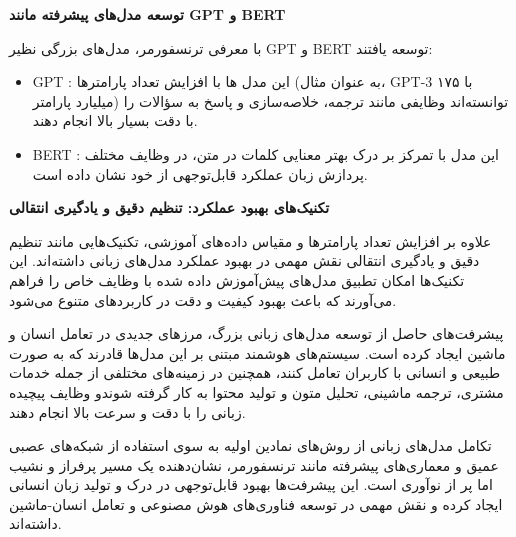 \textbf{توسعه مدل‌های پیشرفته مانند GPT و BERT}

\noindent با معرفی ترنسفورمر، مدل‌های بزرگی نظیر GPT و BERT توسعه یافتند:
\begin{itemize}
	\item GPT
	: این مدل ها با افزایش تعداد پارامترها (به عنوان مثال، GPT-3 با ۱۷۵ میلیارد پارامتر) توانسته‌اند وظایفی مانند ترجمه، خلاصه‌سازی و پاسخ به سؤالات را با دقت بسیار بالا انجام دهند.
	\item BERT
	: این مدل با تمرکز بر درک بهتر معنایی کلمات در متن، در وظایف مختلف پردازش زبان عملکرد قابل‌توجهی از خود نشان داده است.
\end{itemize}

\textbf{تکنیک‌های بهبود عملکرد: تنظیم دقیق و یادگیری انتقالی}

\noindent علاوه بر افزایش تعداد پارامترها و مقیاس داده‌های آموزشی، تکنیک‌هایی مانند تنظیم دقیق
 و یادگیری انتقالی
  نقش مهمی در بهبود عملکرد مدل‌های زبانی داشته‌اند. این تکنیک‌ها امکان تطبیق مدل‌های پیش‌آموزش داده شده با وظایف خاص را فراهم می‌آورند که باعث بهبود کیفیت و دقت در کاربردهای متنوع می‌شود.


پیشرفت‌های حاصل از توسعه مدل‌های زبانی بزرگ، مرزهای جدیدی در تعامل انسان و ماشین ایجاد کرده است. سیستم‌های هوشمند مبتنی بر این مدل‌ها قادرند که به صورت طبیعی و انسانی با کاربران تعامل کنند، همچنین در زمینه‌های مختلفی از جمله خدمات مشتری، ترجمه ماشینی، تحلیل متون و تولید محتوا به کار گرفته شوندو وظایف پیچیده زبانی را با دقت و سرعت بالا انجام دهند.


تکامل مدل‌های زبانی از روش‌های نمادین اولیه به سوی استفاده از شبکه‌های عصبی عمیق و معماری‌های پیشرفته مانند ترنسفورمر، نشان‌دهنده یک مسیر پرفراز و نشیب اما پر از نوآوری است. این پیشرفت‌ها بهبود قابل‌توجهی در درک و تولید زبان انسانی ایجاد کرده و نقش مهمی در توسعه فناوری‌های هوش مصنوعی و تعامل انسان-ماشین داشته‌اند.


